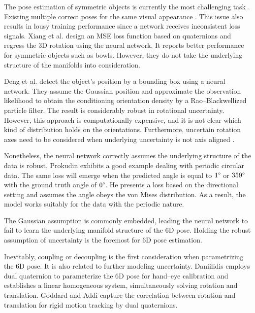 \documentclass[micromachines,article,accept,pdftex,moreauthors]{Definitions/mdpi}
\begin{document}
{The pose estimation of symmetric objects is currently the most challenging task} \cite{hodanEPOSEstimating6D2020}. %
{Existing multiple correct poses for the same visual appearance} \cite{manhardtExplainingAmbiguityObject2019}. {This issue also results} in lousy training performance since a network receives inconsistent loss signals. %
Xiang et al. \cite{xiangPoseCNNConvolutionalNeural2018} design {an MSE loss function based on quaternions and regress the 3D rotation using the neural network.} {It reports better} performance for symmetric objects such as bowls. However, they do not take the underlying structure of the manifolds into consideration.

Deng et al. \cite{dengPoseRBPFRaoBlackwellizedParticle2019} {detect the object's position by a bounding box using a neural network. They assume the Gaussian position and approximate the observation likelihood to obtain the conditioning orientation density by a Rao--Blackwellized particle filter. The result is considerably robust in rotational uncertainty}. However, this approach is computationally expensive, and it is not clear which kind of distribution holds on the orientations. Furthermore, uncertain rotation axes need to be considered when underlying uncertainty is not axis aligned \cite{gilitschenskiDEEPORIENTATIONUNCERTAINTY2020}.

Nonetheless, the {neural network} correctly assumes the underlying structure of the data is {robust}. Prokudin \cite{prokudinDeepDirectionalStatistics2018} exhibits {a good example dealing with periodic circular data}. The same loss will {emerge} when the predicted angle is equal to $1 \text{\textdegree}$ or $359 \text{\textdegree}$ with the ground truth angle {of} $0 \text{\textdegree}$. He {presents} a loss based on {the} directional setting and {assumes} the angle {obeys} the von Mises distribution. As a result, {the model} works {suitably} for the data {with the periodic nature}.

{The} Gaussian {assumption} is commonly {embedded}, leading the neural network to fail to learn {the underlying manifold structure of the} 6D pose. {Holding the robust assumption of uncertainty is the foremost for 6D pose estimation}.

Inevitably, {coupling or decoupling is the first consideration} when parametrizing the 6D pose. It is also related to {further modeling uncertainty}. 
Daniilidis \cite{daniilidisHandEyeCalibrationUsing1999} employs dual quaternion to parameterize the 6D pose for hand--eye calibration and establishes a linear homogeneous system, simultaneously solving rotation and translation. Goddard and Addi \cite{goddardPoseMotionEstimation1998} capture the correlation between rotation and translation for rigid motion tracking by dual quaternions.
\end{document}
